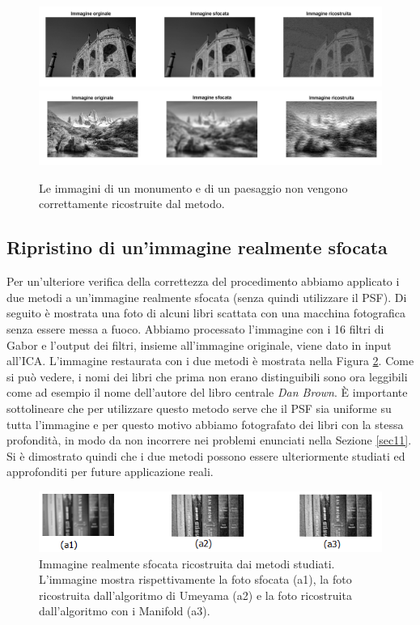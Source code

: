 \documentclass[final]{siamltex}
\begin{document}
{\begin{figure}[h!]
\begin{center}
\includegraphics[width=1\columnwidth]{monumento.png}
\includegraphics[width=1\columnwidth]{paesaggio.png}
\caption{Le immagini di un monumento e di un paesaggio non vengono correttamente ricostruite dal metodo.}
\label{imag:nonfunziona}
\end{center}
\end{figure}
%
%
%
\subsection{Ripristino di un'immagine realmente sfocata} \label{sec12}
Per un'ulteriore verifica della correttezza del procedimento abbiamo applicato i due metodi a un'immagine realmente sfocata (senza quindi utilizzare il PSF). 
Di seguito \`{e} mostrata una foto di alcuni libri scattata con una macchina fotografica senza essere messa a fuoco. Abbiamo processato l'immagine con i 16 filtri di Gabor e l'output dei filtri, insieme all'immagine originale, viene dato in input all'ICA. L'immagine restaurata con i due metodi \`{e} mostrata nella Figura \ref{imgsfocata}. Come si può vedere, i nomi dei libri che prima non erano distinguibili sono ora leggibili come ad esempio il nome dell'autore del libro centrale \textit{Dan Brown}.  \`{E} importante sottolineare che per utilizzare questo metodo serve che il PSF sia uniforme su tutta l'immagine e per questo motivo abbiamo fotografato dei libri con la stessa profondit\`{a}, in modo da non incorrere nei problemi enunciati nella Sezione \ref{sec11}. Si \`{e} dimostrato quindi che i due metodi possono essere ulteriormente studiati ed approfonditi per future applicazione reali.

\begin{figure}[h!]
\begin{center}
\includegraphics[width=1\columnwidth]{immagine_reale.png}
\caption{Immagine realmente sfocata ricostruita dai metodi studiati. L'immagine mostra rispettivamente la foto sfocata (a1), la foto ricostruita dall'algoritmo di Umeyama (a2) e la foto ricostruita dall'algoritmo con i Manifold (a3).}
\label{imgsfocata}
\end{center}
\end{figure}

}
\end{document}
